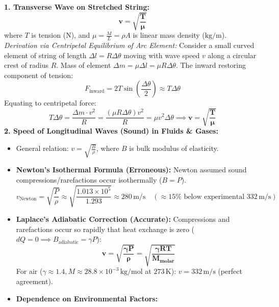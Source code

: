 \documentclass[10pt,a4paper]{article}
\begin{document}
\begin{formulabox}
\textbf{1. Transverse Wave on Stretched String:}
\begin{equation}
  \mathbf{v = \sqrt{\frac{T}{\mu}}}
\end{equation}
where $T$ is tension ($\mathrm{N}$), and $\mu = \frac{M}{L} = \rho A$ is linear mass density ($\mathrm{kg/m}$).
\textit{Derivation via Centripetal Equilibrium of Arc Element:}
Consider a small curved element of string of length $\Delta l = R \Delta\theta$ moving with wave speed $v$ along a circular crest of radius $R$. Mass of element $\Delta m = \mu \Delta l = \mu R \Delta\theta$.
The inward restoring component of tension:
\begin{equation}
  F_{\text{inward}} = 2 T \sin\left(\frac{\Delta\theta}{2}\right) \approx T \Delta\theta
\end{equation}
Equating to centripetal force:
\begin{equation}
  T \Delta\theta = \frac{\Delta m \cdot v^2}{R} = \frac{(\mu R \Delta\theta) v^2}{R} = \mu v^2 \Delta\theta \implies \mathbf{v = \sqrt{\frac{T}{\mu}}}
\end{equation}
\textbf{2. Speed of Longitudinal Waves (Sound) in Fluids \& Gases:}
\begin{itemize}
  \item General relation: $v = \sqrt{\frac{B}{\rho}}$, where $B$ is bulk modulus of elasticity.
  \item \textbf{Newton's Isothermal Formula (Erroneous):} Newton assumed sound compressions/rarefactions occur isothermally ($B = P$).
  \begin{equation}
    v_{\text{Newton}} = \sqrt{\frac{P}{\rho}} \approx \sqrt{\frac{1.013 \times 10^5}{1.293}} \approx 280\,\mathrm{m/s} \quad (\approx 15\% \text{ below experimental } 332\,\mathrm{m/s})
  \end{equation}
  \item \textbf{Laplace's Adiabatic Correction (Accurate):} Compressions and rarefactions occur so rapidly that heat exchange is zero ($dQ=0 \implies B_{\text{adiabatic}} = \gamma P$):
  \begin{equation}
    \mathbf{v = \sqrt{\frac{\gamma P}{\rho}} = \sqrt{\frac{\gamma R T}{M_{\text{molar}}}}}
  \end{equation}
  For air ($\gamma \approx 1.4, M \approx 28.8 \times 10^{-3}\,\mathrm{kg/mol}$ at $273\,\mathrm{K}$): $v = 332\,\mathrm{m/s}$ (perfect agreement).
  \item \textbf{Dependence on Environmental Factors:}

\end{itemize}
\end{formulabox}
\end{document}
